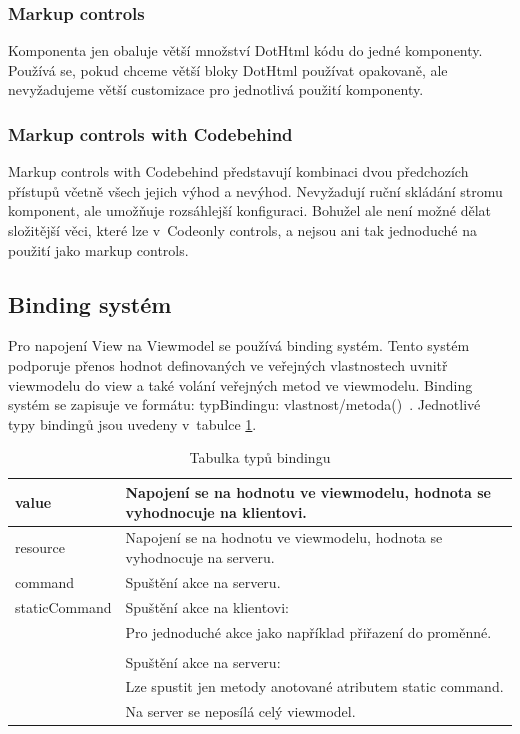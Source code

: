 \subsubsection{Markup controls}
 Komponenta jen obaluje větší množství DotHtml kódu do jedné komponenty. Používá se, pokud chceme větší bloky DotHtml používat opakovaně, ale nevyžadujeme větší customizace pro jednotlivá použití komponenty.
 
 \subsubsection{Markup controls with Codebehind}
 Markup controls with Codebehind představují kombinaci dvou předchozích přístupů včetně všech jejich výhod a nevýhod. Nevyžadují ruční skládání stromu komponent, ale umožňuje rozsáhlejší konfiguraci. Bohužel ale není možné dělat složitější věci, které lze v~Codeonly controls, a nejsou ani tak jednoduché na použití jako markup controls.
 
\subsection*{Binding systém}
\label{DotVVMBinding}
Pro napojení View na Viewmodel se používá binding systém. Tento systém podporuje přenos hodnot definovaných ve veřejných vlastnostech uvnitř viewmodelu do view a také volání veřejných metod ve viewmodelu.
Binding systém se zapisuje ve formátu: {typBindingu: vlastnost/metoda()}~\cite{DotVVM-Binding}. Jednotlivé typy bindingů jsou uvedeny v~tabulce \ref{tab: Tabulka typů bindingu}.

\begin{table}[H]
	\caption{Tabulka typů bindingu} 
	\centering
	\begin{tabular}{m{8em}|m{30em}}
		\toprule
		value & Napojení se na hodnotu ve viewmodelu, hodnota se vyhodnocuje na klientovi.\\ \midrule
		resource & Napojení se na hodnotu ve viewmodelu, hodnota se vyhodnocuje na serveru.\\ \midrule
		command & Spuštění akce na serveru.\\ \midrule
		staticCommand & Spuštění akce na klientovi: \\
		& Pro jednoduché akce jako například přiřazení do proměnné. \\\\
		& Spuštění akce na serveru: \\
		& Lze spustit jen metody anotované atributem static command. \\
		& Na server se neposílá celý viewmodel. \\

		\bottomrule
	\end{tabular}
	\label{tab: Tabulka typů bindingu}
\end{table}

